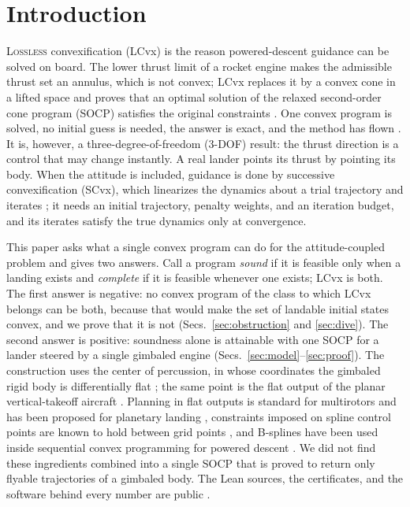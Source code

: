 \section{Introduction}
\lettrine{L}{ossless} convexification (LCvx) is the reason powered-descent guidance can be solved on board. The lower thrust
limit of a rocket engine makes the admissible thrust set an annulus, which is not convex; LCvx replaces it by a convex cone in
a lifted space and proves that an optimal solution of the relaxed second-order cone program (SOCP) satisfies the original
constraints \cite{acikmese2007,acikmese2011,acikmese2013}. One convex program is solved, no initial guess is needed, the
answer is exact, and the method has flown \cite{malyuta2022}. It is, however, a three-degree-of-freedom (3-DOF) result: the
thrust direction is a control that may change instantly. A real lander points its thrust by pointing its body. When the
attitude is included, guidance is done by successive convexification (SCvx), which linearizes the dynamics about a trial
trajectory and iterates \cite{mao2016,szmuk2018,szmuk2020}; it needs an initial trajectory, penalty weights, and an iteration
budget, and its iterates satisfy the true dynamics only at convergence.

This paper asks what a single convex program can do for the attitude-coupled problem and gives two answers. Call a program
\emph{sound} if it is feasible only when a landing exists and \emph{complete} if it is feasible whenever one exists; LCvx is
both. The first answer is negative: no convex program of the class to which LCvx belongs can be both, because that would
make the set of landable initial states convex, and we prove that it is not (Secs.~\ref{sec:obstruction} and \ref{sec:dive}).
The second answer is positive: soundness alone is attainable with one SOCP for a lander steered by a single gimbaled engine
(Secs.~\ref{sec:model}--\ref{sec:proof}). The construction uses the center of percussion, in whose coordinates the gimbaled
rigid body is differentially flat \cite{fliess1995}; the same point is the flat output of the planar vertical-takeoff
aircraft \cite{martin1996}. Planning in flat outputs is standard for multirotors \cite{mellinger2011} and has been proposed
for planetary landing \cite{desiderio2013}, constraints imposed on spline control points are known to hold between grid
points \cite{vanloock2015}, and B-splines have been used inside sequential convex programming for powered descent
\cite{wang2026}. We did not find these ingredients combined into a single SOCP that is proved to return only flyable
trajectories of a gimbaled body. The Lean sources, the certificates, and the software behind every number are public
\cite{repo}.

